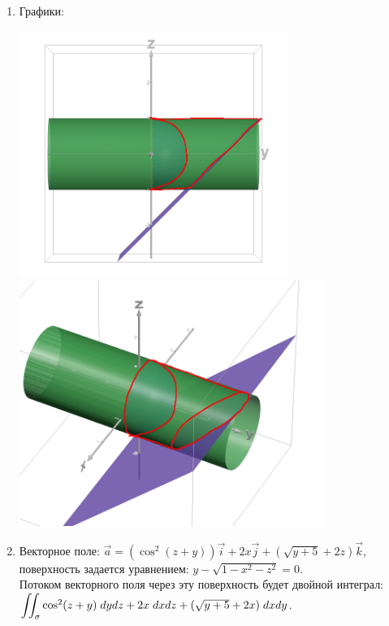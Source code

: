 \begin{enumerate}
    \item Графики:

    \vspace{5mm}

    \includegraphics[height=80mm]{images/5_1a}
    \includegraphics[height=80mm]{images/5_1b}

    \vspace{5mm}

	\item Векторное поле: $\overrightarrow{a} = (\cos^2(z + y))\overrightarrow{i} + 2x\overrightarrow{j} + \left(\sqrt{y + 5} + 2z\right) \overrightarrow{k}$, поверхность задается уравнением: $y - \sqrt{1 - x^2 - z^2} = 0$.\\
    Потоком векторного поля через эту поверхность будет двойной интеграл: ${\displaystyle \iint_\sigma} \cos^2(z+y)\hspace{1mm}dy dz + 2x\hspace{1mm}dx dz + (\sqrt{y + 5} + 2x)\hspace{1mm}dx dy$.


\end{enumerate}
